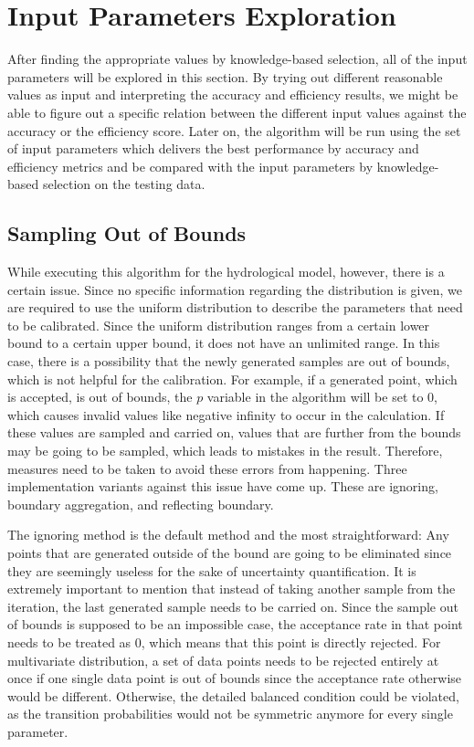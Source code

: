 \section{Input Parameters Exploration}
After finding the appropriate values by knowledge-based selection, all of the input parameters will be explored in this section. By trying out different reasonable values as input and interpreting the accuracy and efficiency results, we might be able to figure out a specific relation between the different input values against the accuracy or the efficiency score. Later on, the algorithm will be run using the set of input parameters which delivers the best performance by accuracy and efficiency metrics and be compared with the input parameters by knowledge-based selection on the testing data.

\subsection{Sampling Out of Bounds}
While executing this algorithm for the hydrological model, however, there is a certain issue. Since no specific information regarding the distribution is given, we are required to use the uniform distribution to describe the parameters that need to be calibrated. Since the uniform distribution ranges from a certain lower bound to a certain upper bound, it does not have an unlimited range. In this case, there is a possibility that the newly generated samples are out of bounds, which is not helpful for the calibration. For example, if a generated point, which is accepted, is out of bounds, the $p$ variable in the algorithm will be set to 0, which causes invalid values like negative infinity to occur in the calculation. If these values are sampled and carried on, values that are further from the bounds may be going to be sampled, which leads to mistakes in the result. Therefore, measures need to be taken to avoid these errors from happening. Three implementation variants against this issue have come up. These are ignoring, boundary aggregation, and reflecting boundary.

The ignoring method is the default method and the most straightforward: Any points that are generated outside of the bound are going to be eliminated since they are seemingly useless for the sake of uncertainty quantification. It is extremely important to mention that instead of taking another sample from the iteration, the last generated sample needs to be carried on. Since the sample out of bounds is supposed to be an impossible case, the acceptance rate in that point needs to be treated as 0, which means that this point is directly rejected. For multivariate distribution, a set of data points needs to be rejected entirely at once if one single data point is out of bounds since the acceptance rate otherwise would be different. Otherwise, the detailed balanced condition could be violated, as the transition probabilities would not be symmetric anymore for every single parameter.

